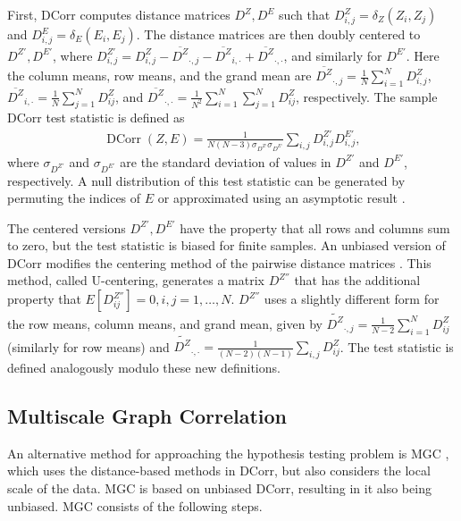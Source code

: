 First, DCorr computes distance matrices $D^Z, D^E$ such that $D^Z_{i,j} = \delta_Z(Z_i, Z_j)$ and $D^E_{i,j} = \delta_E(E_i, E_j)$. The distance matrices are then doubly centered to $D^{Z'}, D^{E'}$, where $D^{Z'}_{i,j} = D^Z_{i,j} - \overline{D^Z}_{\cdot,j} - \overline{D^Z}_{i,\cdot} + \overline{D^Z}_{\cdot,\cdot}$, and similarly for $D^{E'}$. Here the column means, row means, and the grand mean are $\overline{D^Z}_{\cdot, j} = \frac{1}{N}\sum_{i=1}^N D^Z_{i,j}$, $\overline{D^Z}_{i, \cdot} = \frac{1}{N}\sum_{j=1}^N D^Z_{ij}$, and $\overline{D^Z}_{\cdot, \cdot} = \frac{1}{N^2}\sum_{i=1}^N\sum_{j=1}^N D^Z_{ij}$, respectively. The sample DCorr test statistic \cite{szekely2014dcorr} is defined as
\begin{align*}
    \operatorname{DCorr}(Z,E) = \frac{1}{N(N-3)\sigma_{D^{Z'}}\sigma_{D^{E'}}}\sum_{i,j} D^{Z'}_{i,j}D^{E'}_{i,j},
\end{align*}
where $\sigma_{D^{Z'}}$ and $\sigma_{D^{E'}}$ are the standard deviation of values in $D^{Z'}$ and $D^{E'}$, respectively. A null distribution of this test statistic
can be generated by permuting the indices of $E$ or approximated using an asymptotic result \cite{shen2019chi}.

The centered versions $D^{Z'}, D^{E'}$ have the property that all rows and columns sum to zero, but the test statistic is biased for finite samples. An unbiased version of DCorr modifies the centering method of the pairwise distance matrices \cite{szekely2014dcorr}. This method, called U-centering, generates a matrix $D^{Z''}$ that has the additional property that $E[D^{Z''}_{ij}] = 0, i, j = 1, \dots, N$. $D^{Z''}$ uses a slightly different form for the row means, column means, and grand mean, given by $\widetilde{D^{Z}}_{\cdot, j} = \frac{1}{N-2}\sum_{i=1}^N D^{Z}_{ij}$ (similarly for row means) and $\widetilde{D^{Z}}_{\cdot, \cdot} = \frac{1}{(N-2)(N-1)}\sum_{i,j} D^{Z}_{ij}$. The test statistic is defined analogously modulo these new definitions.

\subsection{Multiscale Graph Correlation}
An alternative method for approaching the hypothesis testing problem is MGC \cite{mgc-0, mgc-1, mgc-2}, which uses the distance-based methods in DCorr, but also considers the local scale of the data.
MGC is based on unbiased DCorr, resulting in it also being unbiased. MGC consists of the following steps.

